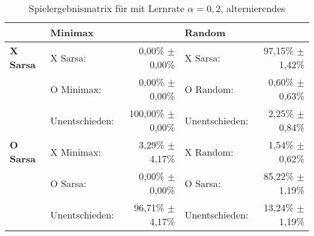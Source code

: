 \begin{table}[!h]
\centering
\caption[Spielergebnismatrix \sarsa: $\alpha=0,2$, alternierendes \splay]{Spielergebnismatrix für \sarsa mit Lernrate $\alpha=0,2$, alternierendes \splay}

\begin{tabular}{llrlr}
\toprule
 & \multicolumn{2}{l}{\textbf{Minimax}} & \multicolumn{2}{l}{\textbf{Random}} \\ \midrule
\textbf{X Sarsa}        & X Sarsa:          & 0,00\% $\pm$    0,00\%            & X Sarsa:              & 97,15\% $\pm$ 1,42\%  \\
                        & O Minimax:        & 0,00\% $\pm$    0,00\%            & O Random:             & 0,60\% $\pm$  0,63\%  \\
                        & Unentschieden:    & 100,00\% $\pm$  0,00\%            & Unentschieden:        & 2,25\% $\pm$  0,84\%  \\ \cmidrule{2-5}
\textbf{O Sarsa}        & X Minimax:        & 3,29\% $\pm$    4,17\%            & X Random:             & 1,54\% $\pm$  0,62\%  \\
                        & O Sarsa:          & 0,00\% $\pm$    0,00\%            & O Sarsa:              & 85,22\% $\pm$ 1,19\%  \\
                        & Unentschieden:    & 96,71\% $\pm$   4,17\%            & Unentschieden:        & 13,24\% $\pm$ 1,19\%  \\ \bottomrule
\end{tabular}
\end{table}